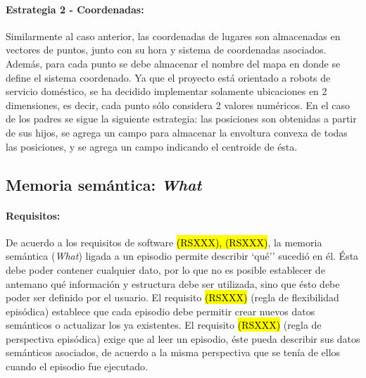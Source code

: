 \paragraph{Estrategia 2 - Coordenadas:}
Similarmente al caso anterior, las coordenadas de lugares son almacenadas en vectores de puntos, junto con su hora y sistema de coordenadas asociados. Además, para cada punto se debe almacenar el nombre del mapa en donde se define el sistema coordenado. Ya que el proyecto está orientado a robots de servicio doméstico, se ha decidido implementar solamente ubicaciones en 2 dimensiones, es decir, cada punto sólo considera 2 valores numéricos. En el caso de los padres se sigue la siguiente estrategia: las posiciones son obtenidas a partir de sus hijos, se agrega un campo para almacenar la envoltura convexa de todas las posiciones, y se agrega un campo indicando el centroide de ésta.

\subsection{Memoria semántica: \textit{What}}

\paragraph{Requisitos:}
De acuerdo a los requisitos de software \hl{(RSXXX), (RSXXX)}, la memoria semántica (\textit{What}) ligada a un episodio permite describir `qué'' sucedió en él. Ésta debe poder  contener cualquier dato, por lo que no es posible establecer de antemano qué información y estructura debe ser utilizada, sino que ésto debe poder ser definido por el usuario. El requisito \hl{(RSXXX)} (regla de flexibilidad episódica) establece que cada episodio debe permitir crear nuevos datos semánticos o actualizar los ya existentes. El requisito \hl{(RSXXX)} (regla de perspectiva episódica) exige que al leer un episodio, éste pueda describir sus datos semánticos asociados, de acuerdo a la misma perspectiva que se tenía de ellos cuando el episodio fue ejecutado.



